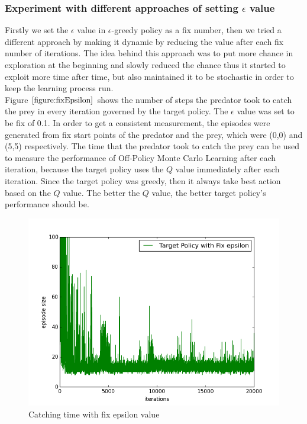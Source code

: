 \documentclass[paper=a4, fontsize=11pt]{scrartcl}
\numberwithin{equation}{section}		%
\numberwithin{figure}{section}			%
\numberwithin{table}{section}				%
\begin{document}
\subsubsection*{Experiment with different approaches of setting $\epsilon$ value}
Firstly we set the $\epsilon$ value in $\epsilon$-greedy policy as a fix number, then we tried a different approach by making it dynamic by reducing the value after each fix number of iterations. The idea behind this approach was to put more chance in exploration at the beginning and slowly reduced the chance thus it started to exploit more time after time, but also maintained it to be stochastic in order to keep the learning process run. \\
Figure $\ref{figure:fixEpsilon}$ shows the number of steps the predator took to catch the prey in every iteration governed by the target policy. The $\epsilon$ value was set to be fix of 0.1. In order to get a consistent measurement, the episodes were generated from fix start points of the predator and the prey, which were (0,0) and (5,5) respectively. The time that the predator took to catch the prey can be used to measure the performance of Off-Policy Monte Carlo Learning after each iteration, because the target policy uses the $Q$ value immediately after each iteration. Since the target policy was greedy, then it always take best action based on the $Q$ value. The better the $Q$ value, the better target policy's performance should be.

\begin{figure}[H] \centering
\includegraphics[scale=0.5]{target_fix_0_1.png}
\caption{Catching time with fix epsilon value} \label{figure:fixEpsilon}
\end{figure}
\end{document}
